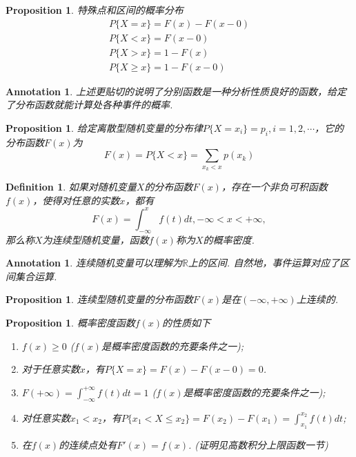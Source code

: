 \documentclass{article}
\newtheorem{proposition}[theorem]{Proposition}
\newtheorem{definition}[theorem]{Definition}
\newtheorem{annotation}[theorem]{Annotation}
\begin{document}
\begin{proposition}
\rm 特殊点和区间的概率分布
$$
\begin{array}{ll}
P\{X = x\} = F(x)-F(x-0) \\
P\{X < x\} = F(x-0) \\
P\{X > x\} = 1-F(x) \\
P\{X \geq x\} = 1-F(x-0) 
\end{array} 
$$
\end{proposition}

\begin{annotation}
\rm {\color{red}上述更贴切的说明了分别函数是一种分析性质良好的函数，给定了分布函数就能计算处各种事件的概率}. 
\end{annotation}

\begin{proposition}
\rm 给定离散型随机变量的分布律$P\{X=x_i\}=p_i,i = 1,2,\cdots$，它的分布函数$F(x)$为
$$
F(x) = P\{X < x\} = \sum\limits_{x_k < x}p(x_k)
$$
\end{proposition}


\begin{definition}
\rm 如果对随机变量$X$的分布函数$F(x)$，存在一个非负可积函数$f(x)$，使得对任意的实数$x$，都有
$$
F(x) = \int_{-\infty}^x f(t)dt, - \infty < x < + \infty,
$$
那么称$X$为{\color{red}连续型随机变量}，函数$f(x)$称为$X$的{\color{red}概率密度}. 
\end{definition}

\begin{annotation}
\rm 连续随机变量可以理解为$\mathbb{R}$上的区间. 自然地，事件运算对应了区间集合运算. 
\end{annotation}

\begin{proposition}
\rm 连续型随机变量的分布函数$F(x)$是在$(-\infty,+\infty)$上连续的.
\end{proposition}

\begin{proposition}\label{probability-density-func: prop1}
\rm 概率密度函数$f(x)$的性质如下
\begin{enumerate}
	\item $f(x) \geq 0$ ({\color{red}$f(x)$是概率密度函数的充要条件之一});
	\item 对于任意实数$x$，有$P\{X=x\} = F(x)-F(x-0) = 0$.
	\item $F(+\infty) = \int_{-\infty}^{+\infty} f(t)dt = 1$ ({\color{red}$f(x)$是概率密度函数的充要条件之一});
	\item 对任意实数$x_1 < x_2$，有$P\{x_1 < X \leq x_2 \} = F(x_2)-F(x_1) = \int_{x_1}^{x_2} f(t)dt$;
	\item 在$f(x)$的连续点处有$F'(x) = f(x)$. (证明见高数积分上限函数一节) 
\end{enumerate}
\end{proposition}
\end{document}
